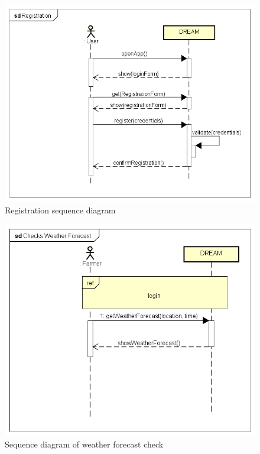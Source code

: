 \newpage
\begin{figure}[H]
    \centering
    \includegraphics[scale=0.7]{Images/RegistrationSequence.png}
    \caption{Registration sequence diagram}
\end{figure}

\bigskip
\begin{figure}[H]
    \centering
    \includegraphics[scale=0.7]{Images/ChecksWeatherForecastSequence.png}
    \caption{Sequence diagram of weather forecast check}
\end{figure}

